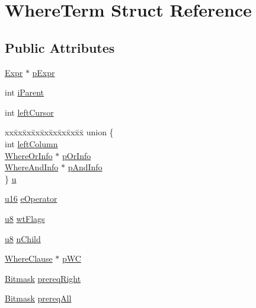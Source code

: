 \hypertarget{struct_where_term}{\section{Where\-Term Struct Reference}
\label{struct_where_term}
}
\subsection*{Public Attributes}
\begin{DoxyCompactItemize}
\item 
\hyperlink{struct_expr}{Expr} $\ast$ \hyperlink{struct_where_term_af5ec32fe3a2e4623c900cb91aa86bc9d}{p\-Expr}
\item 
int \hyperlink{struct_where_term_aa45e0b271713e429fbeba433941d2e22}{i\-Parent}
\item 
int \hyperlink{struct_where_term_a82bb97ef4285d75b1b9c4fcd2025aaf7}{left\-Cursor}
\item 
\begin{tabbing}
xx\=xx\=xx\=xx\=xx\=xx\=xx\=xx\=xx\=\kill
union \{\\
\>int \hyperlink{struct_where_term_a1f6e520bd34633ebb6001cd0c39eef21}{leftColumn}\\
\>\hyperlink{struct_where_or_info}{WhereOrInfo} $\ast$ \hyperlink{struct_where_term_a5f26d197224ff20bc8db4350e6e30c3f}{pOrInfo}\\
\>\hyperlink{struct_where_and_info}{WhereAndInfo} $\ast$ \hyperlink{struct_where_term_a1c2e013c4628164636e36db73f429dea}{pAndInfo}\\
\} \hyperlink{struct_where_term_a0b9e1c1bd5894e80be5d8224422b8463}{u}\\

\end{tabbing}\item 
\hyperlink{sqlite3_8c_a20f2299e322dcbde37cb07b16910b843}{u16} \hyperlink{struct_where_term_af0b4817bee491fa1ee69a87d8ff580c5}{e\-Operator}
\item 
\hyperlink{sqlite3_8c_a74a0f6424ae628af25f23f0a35f6ead3}{u8} \hyperlink{struct_where_term_a5a3ba67885262f1bb9169dcaff0f91b1}{wt\-Flags}
\item 
\hyperlink{sqlite3_8c_a74a0f6424ae628af25f23f0a35f6ead3}{u8} \hyperlink{struct_where_term_af83cf7bae7760b9b1ca398338a35c32a}{n\-Child}
\item 
\hyperlink{struct_where_clause}{Where\-Clause} $\ast$ \hyperlink{struct_where_term_a1fb0a9ede5a12d6d2f7886431b348fb3}{p\-W\-C}
\item 
\hyperlink{sqlite3_8c_afa77b629897c4457bfdc47d364ba5c3f}{Bitmask} \hyperlink{struct_where_term_a1274011fa1ef0639284b7944f4570e67}{prereq\-Right}
\item 
\hyperlink{sqlite3_8c_afa77b629897c4457bfdc47d364ba5c3f}{Bitmask} \hyperlink{struct_where_term_a49b700336b005067352366cfc40de07f}{prereq\-All}
\end{DoxyCompactItemize}


